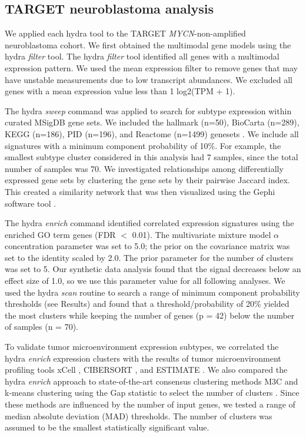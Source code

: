 \documentclass[10pt,letterpaper]{article}
\begin{document}
\subsection*{TARGET neuroblastoma analysis}
We applied each hydra tool to the TARGET \textit{MYCN}-non-amplified neuroblastoma cohort. We first obtained the multimodal gene models using the hydra \textit{filter} tool. The hydra \textit{filter} tool identified all genes with a multimodal expression pattern. We used the mean expression filter to remove genes that may have unstable measurements due to low transcript abundances. We excluded all genes with a mean expression value less than 1 log2(TPM + 1).

The hydra \textit{sweep} command was applied to search for subtype expression within curated MSigDB gene sets. We included the hallmark (n=50), BioCarta (n=289), KEGG (n=186), PID (n=196), and Reactome (n=1499) genesets \cite{liberzonMolecularSignaturesDatabase2011}. We include all signatures with a minimum component probability of 10\%. For example, the smallest subtype cluster considered in this analysis had 7 samples, since the total number of samples was 70. We investigated relationships among differentially expressed gene sets by clustering the gene sets by their pairwise Jaccard index. This created a similarity network that was then visualized using the Gephi software tool \cite{bastian2009gephi}.

The hydra \textit{enrich} command identified correlated expression signatures using the enriched GO term genes (FDR $<$ 0.01). The multivariate mixture model $\alpha$ concentration parameter was set to 5.0; the prior on the covariance matrix was set to the identity scaled by 2.0. The prior parameter for the number of clusters was set to 5. Our synthetic data analysis found that the signal decreases below an effect size of 1.0, so we use this parameter value for all following analyses. We used the hydra \textit{scan} routine to search a range of minimum component probability thresholds (see Results) and found that a threshold/probability of 20\% yielded the most clusters while keeping the number of genes (p = 42) below the number of samples (n = 70).

To validate tumor microenvironment expression subtypes, we correlated the hydra \textit{enrich} expression clusters with the results of tumor microenvironment profiling tools xCell \cite{aranXCellDigitallyPortraying2017}, CIBERSORT \cite{newmanRobustEnumerationCell2015}, and ESTIMATE \cite{yoshiharaInferringTumourPurity2013a}. We also compared the hydra \textit{enrich} approach to state-of-the-art consensus clustering methods M3C \cite{johnM3CMonteCarlo2018} and k-means clustering using the Gap statistic to select the number of clusters \cite{tibshirani2001estimating}. Since these methods are influenced by the number of input genes, we tested a range of median absolute deviation (MAD) thresholds. The number of clusters was assumed to be the smallest statistically significant value.
\end{document}
